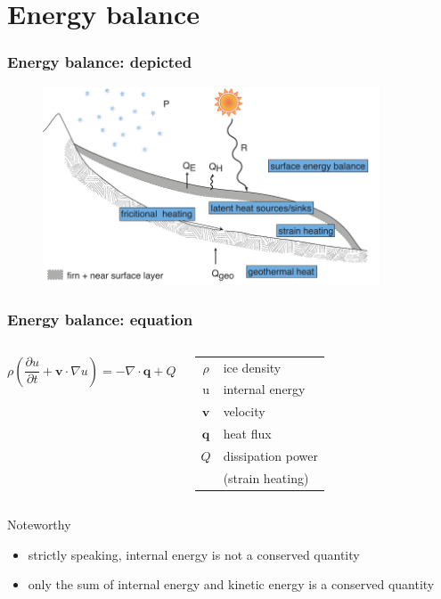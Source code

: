 \documentclass[hide notes,intlimits,handout]{beamer}
\newcommand{\bq}{\mathbf{q}}
\newcommand{\bv}{\mathbf{v}}
\newcommand{\ddt}[1]{\ensuremath{\frac{\partial #1}{\partial t}}}
\newcommand{\Div}{\nabla\cdot}
\newcommand{\grad}{\nabla}
\begin{document}
\section{Energy balance}
\label{sec:energy-balance}

\begin{frame}
  \frametitle{Energy balance: depicted}
  \begin{figure}
    \includegraphics[width=10cm]{figures/glacier_thermodynamics}
  \end{figure}
\end{frame}


\begin{frame}
  \frametitle{Energy balance: equation}
  \begin{columns}
    \column[c]{7cm}
    \begin{equation*}
      \rho \left(\ddt{u} + \bv \cdot \grad u\right) = - \Div \bq + Q
    \end{equation*}
   \vspace{2em}
    \column[c]{6cm}
      \begin{tabular}{cl}
        $\rho$ \quad & ice density \\
        u \quad & internal energy \\
        $\bv$ \quad & velocity \\
        $\bq$ \quad & heat flux \\
        $Q$ \quad & dissipation power \\
             & (strain heating)
      \end{tabular}
    \end{columns}
    \begin{block}{Noteworthy}
      \begin{itemize}
      \item strictly speaking, internal energy is \alert{not} a conserved quantity
      \item only the sum of \alert{internal energy} and \alert{kinetic energy} is a conserved quantity
      \end{itemize}
    \end{block}
\end{frame}
\end{document}
